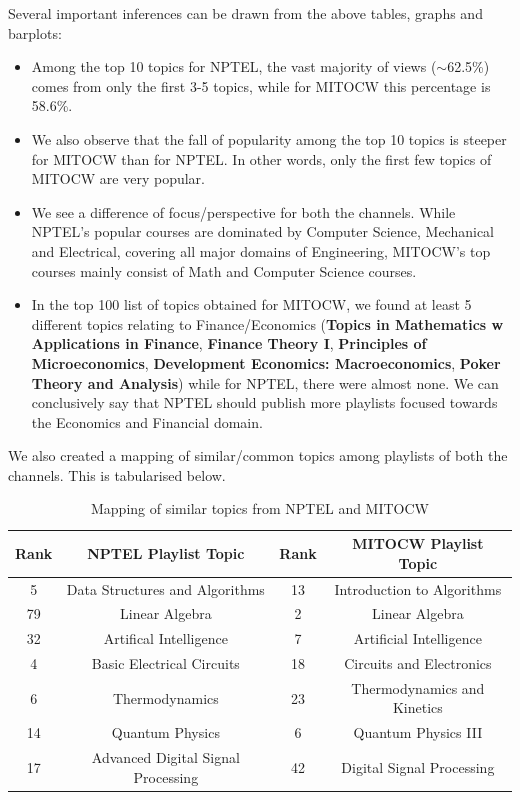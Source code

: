 \documentclass{article}
\begin{document}
Several important inferences can be drawn from the above tables, graphs and barplots:

\begin{itemize}
    \item Among the top 10 topics for NPTEL, the vast majority of views ($\sim$62.5\%) comes from only the first 3-5 topics, while for MITOCW this percentage is 58.6\%.\\
    \item We also observe that the fall of popularity among the top 10 topics is steeper for MITOCW than for NPTEL. In other words, only the first few topics of MITOCW are very popular.\\
    \item We see a difference of focus/perspective for both the channels. While NPTEL's popular courses are dominated by Computer Science, Mechanical and Electrical, covering all major domains of Engineering, MITOCW's top courses mainly consist of Math and Computer Science courses.\\
    \item In the top 100 list of topics obtained for MITOCW, we found at least 5 different topics relating to Finance/Economics (\textbf{Topics in Mathematics w Applications in Finance}, \textbf{Finance Theory I}, \textbf{Principles of Microeconomics}, \textbf{Development Economics: Macroeconomics}, \textbf{Poker Theory and Analysis}) while for NPTEL, there were almost none. We can conclusively say that NPTEL should publish more playlists focused towards the Economics and Financial domain.\\
\end{itemize}

We also created a mapping of similar/common topics among playlists of both the channels. This is tabularised below.

\begin{table}[!htpb]
    \centering
    \begin{tabular}{|c|c|c|c|}
        \hline
        \textbf{Rank} & \textbf{NPTEL Playlist Topic} & \textbf{Rank} & \textbf{MITOCW Playlist Topic}\\
        \hline
         5 & Data Structures and Algorithms & 13 & Introduction to Algorithms\\
         79 & Linear Algebra & 2 & Linear Algebra\\
         32 & Artifical Intelligence & 7 & Artificial Intelligence\\
         4 & Basic Electrical Circuits & 18 & Circuits and Electronics\\
         6 & Thermodynamics & 23 & Thermodynamics and Kinetics\\
         14 & Quantum Physics & 6 & Quantum Physics III\\
         17 & Advanced Digital Signal Processing & 42 & Digital Signal Processing\\
         \hline
    \end{tabular}\vspace{3mm}
    \caption{Mapping of similar topics from NPTEL and MITOCW}
    \label{tab:my_label}
\end{table}
\FloatBarrier
\end{document}
